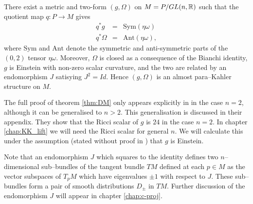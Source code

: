 \begin{theo}{\cite{DM}}\label{thm:DM}
There exist a metric and two-form
$(g,\Omega)$ on $\mbox{\ensuremath{M=P/GL(n,\mathbb{R})}}$ such
that the quotient map $q:P\rightarrow M$ gives
\begin{eqnarray} 
q^{*}g & = & \mathrm{Sym}(\eta\omega) \label{eq:g_cartan} \\
q^{*}\Omega & = & \mathrm{Ant}(\eta\omega), \label{eq:Omega_cartan}
\end{eqnarray}
where $\mathrm{Sym}$ and $\mathrm{Ant}$ denote the symmetric and
anti-symmetric parts of the $(0,2)$ tensor $\eta\omega$. Moreover,
$\Omega$ is closed as a consequence of the Bianchi identity, $g$
is Einstein with non-zero scalar curvature, and the two are related
by an endomorphism $J$ satisying $J^{2}=Id$. Hence $(g,\Omega)$
is an almost para--Kahler structure on $M$.
\end{theo}

\begin{rmk}
The full proof of theorem \ref{thm:DM} only appears explicitly in \cite{DM} in the case $n=2$, although it can be generalised to $n>2$. This generalisation is discussed in their appendix. They show that the Ricci scalar of $g$ is $24$ in the case $n=2$. In chapter \ref{chap:KK_lift} we will need the Ricci scalar for general $n$. We will calculate this under the assumption (stated without proof in \cite{DM}) that $g$ is Einstein.
\end{rmk}

\begin{rmk}
Note that an endomorphism $J$ which squares to the identity defines two $n$--dimensional sub--bundles of the tangent bundle $TM$ defined at each $p\in M$ as the vector subspaces of $T_pM$ which have eigenvalues $\pm 1$ with respect to $J$. These sub--bundles form a pair of smooth distributions $D_\pm$ in $TM$. Further discussion of the endomorphism $J$ will appear in chapter \ref{chap:c-proj}.
\end{rmk}


